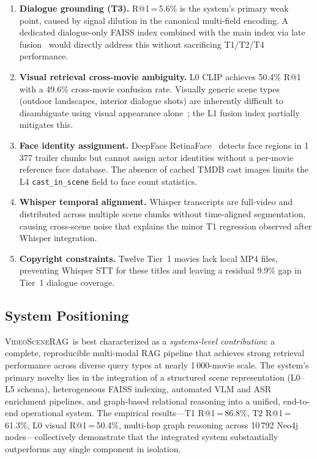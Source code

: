 \documentclass[11pt]{article}
\newcommand{\system}{\textsc{VideoSceneRAG}}
\begin{document}
\begin{enumerate}[leftmargin=1.4em]
  \item \textbf{Dialogue grounding (T3).}  R@1\,=\,5.6\% is the system's
        primary weak point, caused by signal dilution in the canonical
        multi-field encoding.  A dedicated dialogue-only FAISS index combined
        with the main index via late fusion~\cite{colbert,dpr} would directly
        address this without sacrificing T1/T2/T4 performance.

  \item \textbf{Visual retrieval cross-movie ambiguity.}  L0 CLIP achieves
        50.4\% R@1 with a 49.6\% cross-movie confusion rate.  Visually generic
        scene types (outdoor landscapes, interior dialogue shots) are
        inherently difficult to disambiguate using visual appearance
        alone~\cite{clip,openclip}; the L1 fusion index partially mitigates
        this.

  \item \textbf{Face identity assignment.}  DeepFace RetinaFace~\cite{retinaface}
        detects face regions in 1\,377 trailer chunks but cannot assign actor
        identities without a per-movie reference face database.  The absence
        of cached TMDB cast images limits the L4 \texttt{cast\_in\_scene}
        field to face count statistics.

  \item \textbf{Whisper temporal alignment.}  Whisper transcripts are
        full-video and distributed across multiple scene chunks without
        time-aligned segmentation, causing cross-scene noise that explains the
        minor T1 regression observed after Whisper integration.

  \item \textbf{Copyright constraints.}  Twelve Tier~1 movies lack local
        MP4 files, preventing Whisper STT for these titles and leaving a
        residual 9.9\% gap in Tier~1 dialogue coverage.
\end{enumerate}

\subsection{System Positioning}

\system\ is best characterized as a \emph{systems-level contribution}: a
complete, reproducible multi-modal RAG pipeline that achieves strong retrieval
performance across diverse query types at nearly 1\,000-movie scale.  The
system's primary novelty lies in the integration of a structured scene
representation (L0--L5 schema), heterogeneous FAISS indexing, automated VLM
and ASR enrichment pipelines, and graph-based relational reasoning into a
unified, end-to-end operational system.  The empirical results---T1 R@1\,=\,86.8\%,
T2 R@1\,=\,61.3\%, L0 visual R@1\,=\,50.4\%, multi-hop graph reasoning
across 10\,792 Neo4j nodes---collectively demonstrate that the integrated
system substantially outperforms any single component in isolation.
\end{document}
